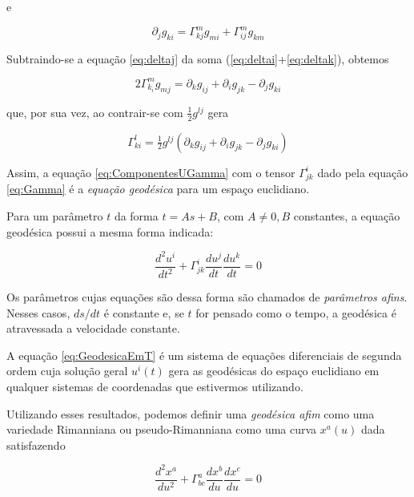 e

\begin{equation}\label{eq:deltaj}
\partial_{j} g_{k i}=\Gamma_{k j}^{m} g_{m i}+\Gamma_{i j}^{m} g_{k m}
\end{equation}

Subtraindo-se a equação \eqref{eq:deltaj} da soma (\eqref{eq:deltai}+\eqref{eq:deltak}), obtemos

\[2 \Gamma_{k_{i}}^{m} g_{m j}=\partial_{k} g_{i j}+\partial_{i} g_{j k}-\partial_{j} g_{k i}\]

que, por sua vez, ao contrair-se com $ \tfrac{1}{2} g^{l j} $ gera

\begin{equation}\label{eq:Gamma}
\boxed{\Gamma_{k i}^{l}=\tfrac{1}{2} g^{l j}\left(\partial_{k} g_{i j}+\partial_{i} g_{j k}-\partial_{j} g_{k i}\right)}
\end{equation}


Assim, a equação \eqref{eq:ComponentesUGamma} com o tensor $ \Gamma_{jk}^i $ dado pela equação \eqref{eq:Gamma} é a \textit{equação geodésica} para um espaço euclidiano.

Para um parâmetro $ t $ da forma $ t = As+B $, com $ A\neq0,B $ constantes, a equação geodésica possui a mesma forma indicada:

\begin{equation}\label{eq:GeodesicaEmT}
\frac{d^{2} u^{i}}{d t^{2}}+\Gamma_{j k}^{i} \frac{d u^{j}}{d t} \frac{d u^{k}}{d t}=0
\end{equation}

Os parâmetros cujas equações são dessa forma são chamados de \textit{parâmetros afins}. Nesses casos, $ ds/dt $ é constante e, se $ t $ for pensado como o tempo, a geodésica é atravessada a velocidade constante.

A equação \eqref{eq:GeodesicaEmT} é um sistema de equações diferenciais de segunda ordem cuja solução geral $ u^i(t) $ gera as geodésicas do espaço euclidiano em qualquer sistemas de coordenadas que estivermos utilizando.

Utilizando esses resultados, podemos definir uma \textit{geodésica afim} como uma variedade Rimanniana ou pseudo-Rimanniana como uma curva $ x^a(u) $ dada satisfazendo

\begin{equation}\label{eq:GeodesicaAfimPseudoRimanniana}
\boxed{\frac{d^{2} x^{a}}{d u^{2}}+\Gamma_{b c}^{a} \frac{d x^{b}}{d u} \frac{d x^{c}}{d u}=0}
\end{equation}


